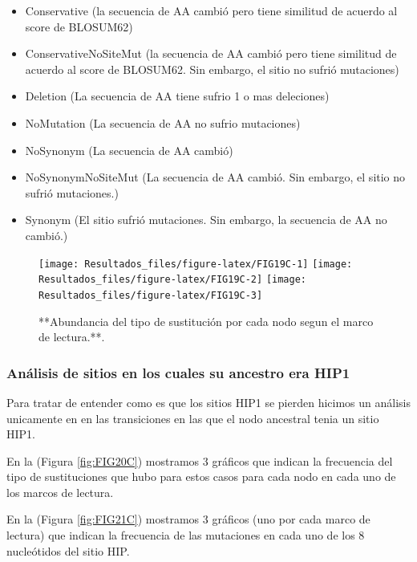 \documentclass[
]{book}
\providecommand{\tightlist}{%
  \setlength{\itemsep}{0pt}\setlength{\parskip}{0pt}}
\begin{document}
\begin{itemize}
\tightlist
\item
  Conservative (la secuencia de AA cambió pero tiene similitud de acuerdo al score de BLOSUM62)
\item
  ConservativeNoSiteMut (la secuencia de AA cambió pero tiene similitud de acuerdo al score de BLOSUM62. Sin embargo, el sitio no sufrió mutaciones)
\item
  Deletion (La secuencia de AA tiene sufrio 1 o mas deleciones)
\item
  NoMutation (La secuencia de AA no sufrio mutaciones)
\item
  NoSynonym (La secuencia de AA cambió)
\item
  NoSynonymNoSiteMut (La secuencia de AA cambió. Sin embargo, el sitio no sufrió mutaciones.)
\item
  Synonym (El sitio sufrió mutaciones. Sin embargo, la secuencia de AA no cambió.)
\end{itemize}

\begin{figure}

{\centering \texttt{[image: Resultados\_files/figure-latex/FIG19C-1]} \texttt{[image: Resultados\_files/figure-latex/FIG19C-2]} \texttt{[image: Resultados\_files/figure-latex/FIG19C-3]} 

}

\caption{**Abundancia del tipo de sustitución por cada nodo segun el marco de lectura.**.}\label{fig:FIG19C}
\end{figure}

\hypertarget{anuxe1lisis-de-sitios-en-los-cuales-su-ancestro-era-hip1-1}{%
\subsubsection{Análisis de sitios en los cuales su ancestro era HIP1}\label{anuxe1lisis-de-sitios-en-los-cuales-su-ancestro-era-hip1-1}}

Para tratar de entender como es que los sitios HIP1 se pierden hicimos un análisis unicamente en en las transiciones en las que el nodo ancestral tenia un sitio HIP1.

En la (Figura \ref{fig:FIG20C}) mostramos 3 gráficos que indican la frecuencia del tipo de sustituciones que hubo para estos casos para cada nodo en cada uno de los marcos de lectura.

En la (Figura \ref{fig:FIG21C}) mostramos 3 gráficos (uno por cada marco de lectura) que indican la frecuencia de las mutaciones en cada uno de los 8 nucleótidos del sitio HIP.
\end{document}
